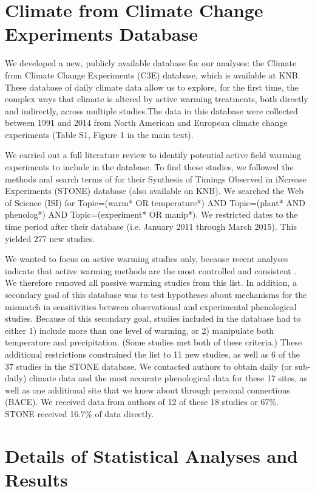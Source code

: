 \documentclass{article}
\begin{document}
\section* {Climate from Climate Change Experiments Database}
\par We developed a new, publicly available database for our analyses: the Climate from Climate Change Experiments (C3E) database, which is available at KNB. These database of daily climate data allow us to explore, for the first time, the complex ways that climate is altered by active warming treatments, both directly and indirectly, across multiple studies.The data in this database were collected between 1991 and 2014 from North American and European climate change experiments (Table S1, Figure 1 in the main text). 
 \par We carried out a full literature review to identify potential active field warming experiments to include in the database. To find these studies, we followed the methods and search terms of \citep{wolkovich2012} for their Synthesis of Timings Observed in iNcrease Experiments (STONE) database (also available on KNB). We searched the Web of Science (ISI) for Topic=(warm* OR temperature*) AND Topic=(plant* AND phenolog*) AND Topic=(experiment* OR manip*). We restricted dates to the time period after their database (i.e. January 2011 through March 2015). This yielded 277 new studies. 
 \par We wanted to focus on active warming studies only, because recent analyses indicate that active warming methods are the most controlled and consistent \citep{kimball2005,kimball2008,aronson2009,wolkovich2012}. We therefore removed all passive warming studies from this list. In addition, a secondary goal of this database was to test hypotheses about mechanisms for the mismatch in sensitivities between observational and experimental phenological studies. Because of this secondary goal, studies included in the database had to either 1) include more than one level of warming, or 2) manipulate both temperature and precipitation. (Some studies met both of these criteria.) These additional restrictions constrained the list to 11 new studies, as well as 6 of the 37 studies in the STONE database. We contacted authors to obtain daily (or sub-daily) climate data and the most accurate phenological data for these 17 sites, as well as one additional site that we knew about through personal connections (BACE).  We received data from authors of 12 of these 18 studies or 67\%. STONE received 16.7\% of data directly.
\section* {Details of Statistical Analyses and Results}
\end{document}
